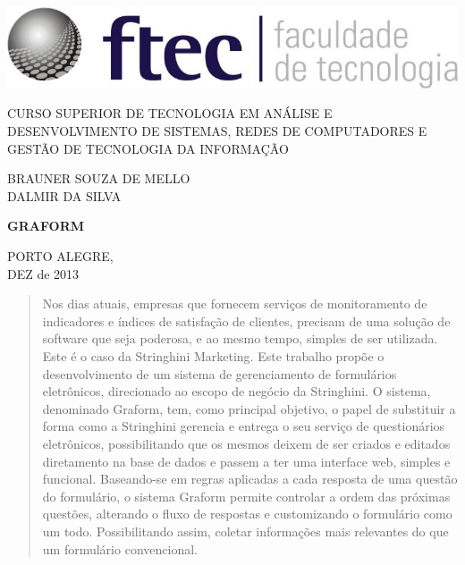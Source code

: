 \documentclass[11pt]{article}
\begin{document}
  \begin{titlepage}
  
    \centering
    \includegraphics[width=.5\textwidth]{logo.jpg}

    \large{CURSO SUPERIOR DE TECNOLOGIA EM ANÁLISE E DESENVOLVIMENTO DE SISTEMAS, REDES DE COMPUTADORES E GESTÃO DE TECNOLOGIA DA INFORMAÇÃO}


    \large{BRAUNER SOUZA DE MELLO\\DALMIR DA SILVA}

    \large{\textbf{GRAFORM}}

    \large{PORTO ALEGRE, \\DEZ de 2013}
    
  \end{titlepage}

  \newpage
  \thispagestyle{empty}
  \mbox{}
  
  \newpage
  
  \tableofcontents
  
  \newpage
  
  \listoffigures
  \listoftables

  \newpage
  
  \begin{abstract}
    Nos dias atuais, empresas que fornecem serviços de monitoramento de 
    indicadores e índices de satisfação de clientes, precisam de uma 
    solução de software que seja poderosa, e ao mesmo tempo, simples de 
    ser utilizada. Este é o caso da Stringhini Marketing. 
    Este trabalho propõe o desenvolvimento de um sistema de 
    gerenciamento de formulários eletrônicos, direcionado ao escopo de 
    negócio da Stringhini. O sistema, denominado Graform, tem, como 
    principal objetivo, o papel de substituir a forma como a Stringhini
    gerencia e entrega o seu serviço de questionários eletrônicos, 
    possibilitando que os mesmos deixem de ser criados e editados 
    diretamento na base de dados e passem a ter uma interface web, 
    simples e funcional. 
    Baseando-se em regras aplicadas a cada resposta de uma  questão do
    formulário, o sistema Graform permite controlar a ordem das 
    próximas questões, alterando o fluxo de respostas e customizando 
    o formulário como um todo. Possibilitando assim, coletar 
    informações mais relevantes do que um formulário convencional.
  \end{abstract}
\end{document}
